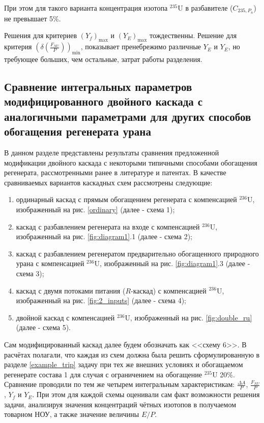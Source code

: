 {При этом для такого варианта концентрация изотопа $^{235}$U в разбавителе ($C_{235,P_{n}}$) не превышает 5\%.

Решения для критериев $(Y_f)_\text{max}$ и $(Y_{E})_\text{max}$ тождественны. Решение для критерия $(\delta(\frac{F_{NU}}{P}))_\text{min}$, показывает пренебрежимо различные $Y_{E}$ и $Y_{E}$, но требующее больших, чем остальные, затрат работы разделения.

\subsection{Сравнение интегральных параметров модифицированного двойного каскада с аналогичными параметрами для других способов обогащения регенерата урана}

В данном разделе представлены результаты сравнения предложенной модификации двойного каскада с некоторыми типичными способами обогащения регенерата, рассмотренными ранее в литературе и патентах. В качестве сравниваемых вариантов каскадных схем рассмотрены следующие: 

\begin{enumerate}
    \item ординарный каскад с прямым обогащением регенерата с компенсацией $^{236}$U, изображенный на рис. \ref{ordinary} (далее - схема 1);
    \item каскад с разбавлением регенерата на входе с компенсацией $^{236}$U, изображенный на рис. \ref{fig:diagram1}.1 (далее - схема 2);
    \item каскад с разбавлением регенератом предварительно обогащенного природного урана с компенсацией $^{236}$U, изображенный на рис. \ref{fig:diagram1}.3 (далее - схема 3);
    \item каскад с двумя потоками питания ($R$-каскад) с компенсацией $^{236}$U, изображенный на рис. \ref{fig:2_inputs} (далее - схема 4);
    \item двойной каскад с компенсацией $^{236}$U, изображенный на рис. \ref{fig:double_ru} (далее - схема 5).
\end{enumerate}

Сам модифицированный каскад далее будем обозначать как <<схему 6>>. В расчётах полагали, что каждая из схем должна была решить сформулированную в разделе \ref{example_trip} задачу при тех же внешних условиях и обогащаемом регенерате состава 1 для случая с ограничением на обогащение $^{235}$U 20\%. Сравнение проводили по тем же четырем интегральным характеристикам: $\frac{\Delta A}{P}$, $\frac{F_{NU}}{P}$, $Y_f$ и $Y_E$. При этом для каждой схемы оценивали сам факт возможности решения задачи, анализируя значения концентраций чётных изотопов в получаемом товарном НОУ, а также значение величины $E/P$. 

}
